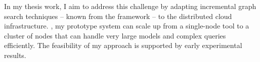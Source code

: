 In my thesis work, I aim to address this challenge by adapting incremental graph search techniques -- known from the \incquery{} framework -- to the distributed cloud infrastructure. \incqueryD, my prototype system can scale up from a single-node tool to a cluster of nodes that can handle very large models and complex queries efficiently. The feasibility of my approach is supported by early experimental results.

\vfill

